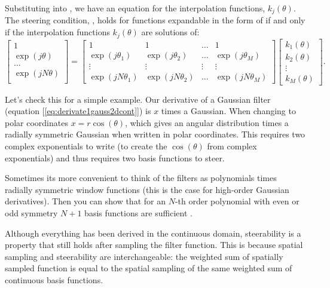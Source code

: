 Substituting \eqn{\ref{eq:fourierseriesinangle}} into
\eqn{\ref{eq:steeringcondition}}, we have an equation for the
interpolation functions, $k_{j}(\theta)$.  
The steering condition, \eqn{\ref{eq:steeringcondition}}, holds for functions
expandable in the form of \eqn{\ref{eq:fourierseriesinangle}} if and only if the
interpolation functions $k_{j}(\theta)$ are solutions of:
\begin{equation}
\left[
\begin{array}{c}
1 \\
\exp (j \theta) \\
\ldots \\
\exp (j N \theta) \\
\end{array}
\right]
=
\left[ 
\begin{array}{cccc}
1 & 1 & \ldots & 1 \\
\exp (j \theta_{1}) & \exp (j \theta_{2}) & \ldots & \exp (j \theta_{M}) \\
\vdots & \vdots & \vdots & \vdots \\
\exp (j N \theta_{1}) & \exp (j N \theta_{2}) & \ldots & \exp (j N \theta_{M})
\end{array}
\right]
\left[
\begin{array}{c}
k_{1}(\theta) \\ k_{2}(\theta) \\ \vdots \\ k_{M}(\theta) 
\end{array}
\right].
\label{eq:theorembigmatrix}
\end{equation}

Let's check this for a simple example.  Our derivative of a Gaussian filter (equation [\ref{eq:derivate1gauss2dcont}]) is $x$ times a
Gaussian.  When changing to polar coordinates $x=r \cos( \theta)$, which gives an angular distribution times a radially symmetric Gaussian when written in polar coordinates.  This requires two complex exponentials to write (to create the $\cos (\theta)$ from complex exponentials) and thus requires two basis functions to steer.

Sometimes its more convenient to think of the filters as polynomials times radially symmetric window functions (this is the case for high-order Gaussian derivatives).  Then you can show that for an $N$-th order polynomial with even or odd symmetry $N+1$ basis functions are sufficient \cite{Freeman91}. 

Although everything has been derived in the continuous domain, steerability is a property that still holds after sampling the filter function. This is because spatial sampling and steerability are interchangeable: the weighted sum of spatially sampled function is equal to the spatial sampling of the same weighted sum of continuous basis functions. 

